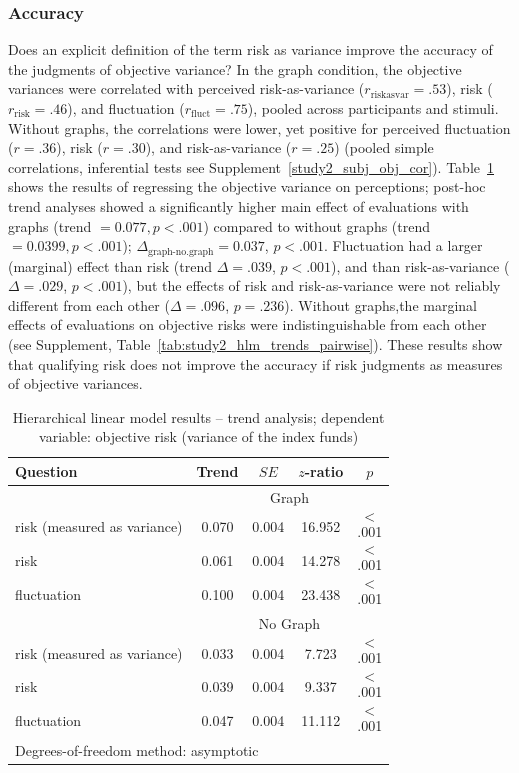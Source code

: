 \documentclass[a4paper,man, natbib,floatsintext]{apa6} %
\begin{document}
\subsubsection{Accuracy}
Does an explicit definition of the term risk as variance improve the accuracy of the judgments of objective variance? In the graph condition, the objective variances were correlated with perceived risk-as-variance ($r_{\text{riskasvar}} = .53$), risk ($r_{\text{risk}} =.46$), and fluctuation ($r_{\text{fluct}} = .75$), pooled across participants and stimuli. Without graphs, the correlations were lower, yet positive for perceived fluctuation ($r=.36$), risk ($r=.30$), and risk-as-variance ($r=.25$) (pooled simple correlations, inferential tests see Supplement~\ref{study2_subj_obj_cor}). Table~\ref{tab:study2_hlm_trends} shows the results of regressing the objective variance on perceptions; post-hoc trend analyses showed a significantly higher main effect of evaluations with graphs (trend $=0.077, p < .001$) compared to without graphs (trend $=0.0399, p < .001$); $\Delta_{\text{graph-no.graph}}=0.037$, $p<.001$. Fluctuation had a larger  (marginal) effect than risk (trend $\Delta=.039$, $p<.001$), and than risk-as-variance ($\Delta=.029$, $p < .001$), but the effects of risk and risk-as-variance were not reliably different from each other ($\Delta=.096$, $p=.236$). Without graphs,the marginal effects of evaluations on objective risks were indistinguishable from each other (see Supplement, Table~\ref{tab:study2_hlm_trends_pairwise}). These results show that qualifying risk does not improve the accuracy if risk judgments as measures of objective variances.


\begin{table}[ht!]
\centering
\caption{Hierarchical linear model results -- trend analysis; dependent variable: objective risk (variance of the index funds)} 
\label{tab:study2_hlm_trends}
\begin{tabular}{lcccc}
  \toprule
Question & Trend & $SE$ & $z$-ratio & $p$ \\ 
  \midrule
& \multicolumn{4}{c}{Graph}\\
\cmidrule{2-5}
  risk (measured as variance) & 0.070 & 0.004 & 16.952 & $$<$$.001 \\ 
  risk & 0.061 & 0.004 & 14.278 & $$<$$.001 \\ 
   fluctuation & 0.100 & 0.004 & 23.438 & $$<$$.001 \\ 
   \midrule
& \multicolumn{4}{c}{No Graph}\\
\cmidrule{2-5} 
risk (measured as variance) & 0.033 & 0.004  & 7.723 & $$<$$.001 \\ 
  risk & 0.039 & 0.004  & 9.337 & $$<$$.001 \\ 
  fluctuation & 0.047 & 0.004  & 11.112 & $$<$$.001 \\ 
   \bottomrule
\multicolumn{5}{l}{\rule{0em}{2.5ex}{\footnotesize Degrees-of-freedom method: asymptotic}}\\
\end{tabular}
\end{table}
%
\end{document}
